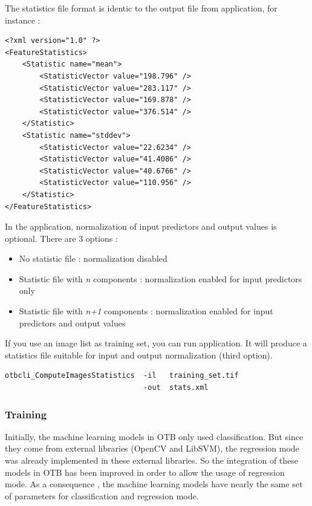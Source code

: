 The statistics file format is identic to the output file from 
application, for instance :
\begin{verbatim}
<?xml version="1.0" ?>
<FeatureStatistics>
    <Statistic name="mean">
        <StatisticVector value="198.796" />
        <StatisticVector value="283.117" />
        <StatisticVector value="169.878" />
        <StatisticVector value="376.514" />
    </Statistic>
    <Statistic name="stddev">
        <StatisticVector value="22.6234" />
        <StatisticVector value="41.4086" />
        <StatisticVector value="40.6766" />
        <StatisticVector value="110.956" />
    </Statistic>
</FeatureStatistics>
\end{verbatim}

In the  application, normalization of input predictors
and output values is optional. There are 3 options :
\begin{itemize}
\item No statistic file : normalization disabled
\item Statistic file with \textit{n} components : normalization enabled for input predictors only
\item Statistic file with \textit{n+1} components : normalization enabled for input predictors and output values
\end{itemize}

If you use an image list as training set, you can run 
application. It will produce a statistics file suitable for input and output normalization (third option).

\begin{verbatim}
otbcli_ComputeImagesStatistics  -il   training_set.tif
                                -out  stats.xml
\end{verbatim}

\subsubsection{Training}

Initially, the machine learning models in OTB only used classification. But since
they come from external libraries (OpenCV and LibSVM), the regression mode was
already implemented in these external libraries. So the integration of these models
in OTB has been improved in order to allow the usage of regression mode. As a consequence
, the machine learning models have nearly the same set of parameters for
classification and regression mode.


